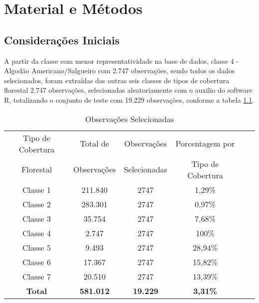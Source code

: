 \chapter{Material e Métodos}

\section{Considerações Iniciais}
A partir da classe com menor representatividade na base de dados, classe 4 - Algodão Americano/Salgueiro com 2.747 observações, sendo todos os dados selecionados, foram extraídas das outras seis classes de tipos de cobertura florestal 2.747 observações, selecionadas aleatoriamente com o auxilio do software R, totalizando o conjunto de teste com 19.229 observações, conforme a tabela \ref{tb:dados}.

\begin{table}[htbp]
\caption{Observações Selecionadas}
\label{tb:dados}
\centering
\setlength{\tabcolsep}{5pt}
\begin{tabular}{cccccc}
\hline
Tipo de Cobertura  &Total de  &Observações  &Porcentagem por \\
Florestal &Observações &Selecionadas &Tipo de Cobertura \\
\hline
Classe 1 &211.840 &2747 &1,29\% \\
Classe 2 &283.301 &2747 &0,97\% \\
Classe 3 &35.754  &2747 &7,68\% \\
Classe 4 &2.747   &2747 &100\% \\
Classe 5 &9.493   &2747 &28,94\% \\
Classe 6 &17.367  &2747 &15,82\% \\
Classe 7 &20.510  &2747 &13,39\% \\
\hline
\textbf{Total} &\textbf{581.012} &\textbf{19.229} &\textbf{3,31\%} \\
\hline
\end{tabular}
\\
\end{table}
